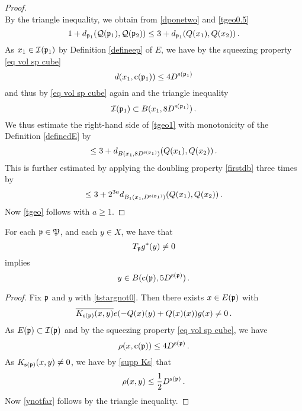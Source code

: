 {\begin{proof}
\begin{equation}
\end{equation}
By the triangle inequality, we obtain from \eqref{dponetwo} and
\eqref{tgeo0.5}
\begin{equation}\label{tgeo1}
     1+d_{\mathfrak p_1}(\mathcal{Q}(\mathfrak p_1), \mathcal{Q}(\mathfrak p_2))\le  3 +d_{\mathfrak p_1}({Q}(x_1), {Q}(x_2))\, .
\end{equation}
As $x_1\in \mathcal{I}(\mathfrak p_1)$ by Definition \eqref{defineep} of $E$, we have by the squeezing property  \eqref{eq vol sp cube}
\begin{equation}
    d(x_1,\mathrm{c}(\mathfrak p_1))\le 4D^{\mathrm{s}(\mathfrak p_1)}
\end{equation}
and thus by \eqref{eq vol sp cube} again and the triangle inequality
\begin{equation}
    \mathcal{I}(\mathfrak p_1)\subset B(x_1,8D^{\mathrm{s}(\mathfrak p_1)})\, .
\end{equation}
We thus estimate the right-hand side of \eqref{tgeo1} with monotonicity of the  Definition \eqref{definedE} by
\begin{equation}\label{tgeo1.5}
    \le  3+d_{B(x_1,8D^{\mathrm{s}(\mathfrak p_1)})}({Q}(x_1), {Q}(x_2))\, .
\end{equation}
This is further estimated by applying the doubling property  \eqref{firstdb} three times by
\begin{equation}\label{tgeo2}
    \le  3+2^{3a}d_{B_1(x_1, D^{\mathrm{s}(\mathfrak p_1)})}({Q}(x_1), {Q}(x_2))\, .
\end{equation}
Now \eqref{tgeo} follows with $a\ge 1$.
\end{proof}




\begin{lemma}\label{lem tstarsupport}
    For each $\mathfrak p\in \mathfrak P$, and each $y\in X$, we have that
\begin{equation}\label{tstargnot0}
     T_{\mathfrak p} g^*(y)\neq 0
\end{equation}
   implies
\begin{equation}\label{ynotfar}
    y\in  B(\mathrm{c}(\mathfrak p),5D^{\mathrm{s}(\mathfrak p)})\, .
\end{equation}
\end{lemma}
\begin{proof}
Fix $\mathfrak p$ and $y$ with \eqref{tstargnot0}.
Then there exists $x\in E(\mathfrak p)$ with
\begin{equation}
   \overline{K_{\mathrm{s}(\mathfrak p)}(x,y)}e(-{Q}(x)(y)
    +{Q}(x)(x))g(x) \neq 0\, .
\end{equation}
As $E(\mathfrak p)\subset \mathcal{I}(\mathfrak p)$ and by the squeezing property
\eqref{eq vol sp cube}, we have
\begin{equation}
    \rho(x,\mathrm{c}(\mathfrak p))\le 4D^{\mathrm{s}(\mathfrak p)}\, .
\end{equation}
As $K_{\mathrm{s}(\mathfrak p)}(x,y)\neq 0$, we have by  \eqref{supp Ks}
that
\begin{equation}
\rho(x,y)\le \frac 12 D^{\mathrm{s}(\mathfrak p)}\, .
\end{equation}
Now \eqref{ynotfar} follows by the triangle inequality.
\end{proof}


}
